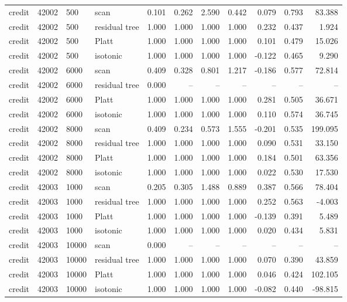 \begin{tabular}{lrllrrrrrrr}
credit & 42002 & 500 & scan & 0.101 & 0.262 & 2.590 & 0.442 & 0.079 & 0.793 & 83.388 \\
credit & 42002 & 500 & residual tree & 1.000 & 1.000 & 1.000 & 1.000 & 0.232 & 0.437 & 1.924 \\
credit & 42002 & 500 & Platt & 1.000 & 1.000 & 1.000 & 1.000 & 0.101 & 0.479 & 15.026 \\
credit & 42002 & 500 & isotonic & 1.000 & 1.000 & 1.000 & 1.000 & -0.122 & 0.465 & 9.290 \\
credit & 42002 & 6000 & scan & 0.409 & 0.328 & 0.801 & 1.217 & -0.186 & 0.577 & 72.814 \\
credit & 42002 & 6000 & residual tree & 0.000 & -- & -- & -- & -- & -- & -- \\
credit & 42002 & 6000 & Platt & 1.000 & 1.000 & 1.000 & 1.000 & 0.281 & 0.505 & 36.671 \\
credit & 42002 & 6000 & isotonic & 1.000 & 1.000 & 1.000 & 1.000 & 0.110 & 0.574 & 36.745 \\
credit & 42002 & 8000 & scan & 0.409 & 0.234 & 0.573 & 1.555 & -0.201 & 0.535 & 199.095 \\
credit & 42002 & 8000 & residual tree & 1.000 & 1.000 & 1.000 & 1.000 & 0.090 & 0.531 & 33.150 \\
credit & 42002 & 8000 & Platt & 1.000 & 1.000 & 1.000 & 1.000 & 0.184 & 0.501 & 63.356 \\
credit & 42002 & 8000 & isotonic & 1.000 & 1.000 & 1.000 & 1.000 & 0.022 & 0.530 & 17.530 \\
credit & 42003 & 1000 & scan & 0.205 & 0.305 & 1.488 & 0.889 & 0.387 & 0.566 & 78.404 \\
credit & 42003 & 1000 & residual tree & 1.000 & 1.000 & 1.000 & 1.000 & 0.252 & 0.563 & -4.003 \\
credit & 42003 & 1000 & Platt & 1.000 & 1.000 & 1.000 & 1.000 & -0.139 & 0.391 & 5.489 \\
credit & 42003 & 1000 & isotonic & 1.000 & 1.000 & 1.000 & 1.000 & 0.020 & 0.434 & 5.831 \\
credit & 42003 & 10000 & scan & 0.000 & -- & -- & -- & -- & -- & -- \\
credit & 42003 & 10000 & residual tree & 1.000 & 1.000 & 1.000 & 1.000 & 0.070 & 0.390 & 43.859 \\
credit & 42003 & 10000 & Platt & 1.000 & 1.000 & 1.000 & 1.000 & 0.046 & 0.424 & 102.105 \\
credit & 42003 & 10000 & isotonic & 1.000 & 1.000 & 1.000 & 1.000 & -0.082 & 0.440 & -98.815 \\

\end{tabular}
